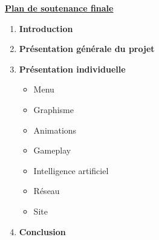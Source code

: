\documentclass[a4paper, 12pt]{article}
\begin{document}
\begin{center}
\Huge{\bf{\underline{Plan de soutenance finale}}}
\end{center}
\begin{enumerate}

\Large \item {\bf{Introduction}}
\item \Large{\bf{Présentation générale du projet }}
\begin{itemize}
\end{itemize}
\item \Large{\bf{Présentation individuelle}}
\begin{large}
\begin{itemize}
\item Menu
\item Graphisme
\item Animations
\item Gameplay
\item Intelligence artificiel
\item Réseau
\item Site
\end{itemize}
\end{large}
\item \Large{\bf{Conclusion}}
\begin{itemize}
\end{itemize}
\end{enumerate}
\end{document}
